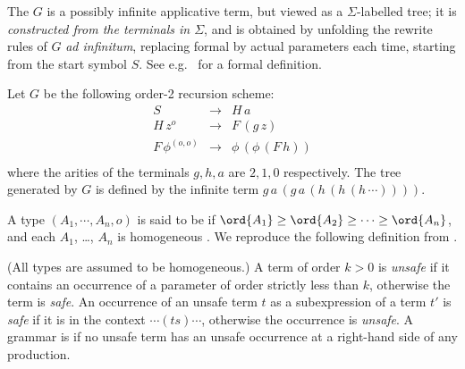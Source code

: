 The  $G$ is a possibly
infinite applicative term, but viewed as a $\Sigma$-labelled tree;
it is \emph{constructed from the terminals in $\Sigma$}, and is obtained by
unfolding the rewrite rules of $G$ \emph{ad infinitum}, replacing
formal by actual parameters each time, starting from the start symbol
$S$. See e.g.~\cite{KNU02} for a formal definition.

\pssetcomptree
{}
\begin{example}\rm\label{eg:running}
  Let $G$ be the following order-2 recursion scheme:
\[\begin{array}{rll}
  S & \rightarrow & H \, a\\
  H \, z^o & \rightarrow & F \, (g \,
  z)\\
  F \, \phi^{(o, o)} & \rightarrow & \phi \, (\phi \, (F \, h))\\
\end{array}\]
where the arities of the terminals $g, h, a$ are $2, 1, 0$ respectively.
The tree generated by $G$ is defined by the infinite term $g \, a \, (g \, a \, (h \, (h \, (h \,
\cdots))))$.%

\end{example}

A type $(A_1, \cdots, A_n, o)$ is said to be  if
$\ord{A_1} \geq \ord{A_2}\geq \cdots \geq \ord{A_n}$, and each $A_1$,
\ldots, $A_n$ is homogeneous \cite{KNU02}.  We reproduce the following
definition from \cite{KNU02}.

\begin{definition}\rm
  (All types are assumed to be homogeneous.) A term of order $k > 0$
  is \emph{unsafe} if it contains an occurrence of a parameter of
  order strictly less than $k$, otherwise the term is \emph{safe}. An
  occurrence of an unsafe term $t$ as a subexpression of a term $t'$
  is \emph{safe} if it is in the context $\cdots (ts) \cdots$,
  otherwise the occurrence is \emph{unsafe}. A grammar is
   if no unsafe term has an unsafe occurrence at a
  right-hand side of any production.
\end{definition}

